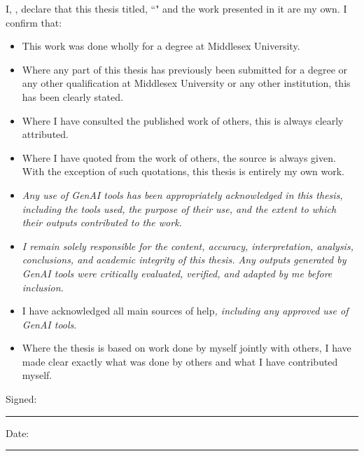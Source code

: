 \noindent I, \authorStudentName, declare that this thesis titled, ``\thesisTitle" and the work presented in it are my own. I confirm that:

\begin{itemize} 
\item This work was done wholly for a degree at Middlesex University.
\item Where any part of this thesis has previously been submitted for a degree or any other qualification at Middlesex University or any other institution, this has been clearly stated.
\item Where I have consulted the published work of others, this is always clearly attributed.
\item Where I have quoted from the work of others, the source is always given. With the exception of such quotations, this thesis is entirely my own work.
\item \textit{Any use of GenAI tools has been appropriately acknowledged in this thesis, including the tools used, the purpose of their use, and the extent to which their outputs contributed to the work.}
\item \textit{I remain solely responsible for the content, accuracy, interpretation, analysis, conclusions, and academic integrity of this thesis. Any outputs generated by GenAI tools were critically evaluated, verified, and adapted by me before inclusion.}
\item I have acknowledged all main sources of help\textit{, including any approved use of GenAI tools}.
\item Where the thesis is based on work done by myself jointly with others, I have made clear exactly what was done by others and what I have contributed myself.\\
\end{itemize}

\vspace{0.5cm}

\noindent Signed:\\
\rule[0.5em]{25em}{0.5pt} %

\vspace{1cm}

\noindent Date:\\
\rule[0.5em]{25em}{0.5pt} %
\
